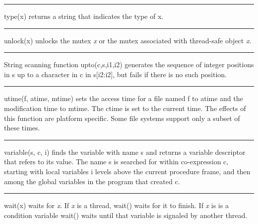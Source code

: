 \bigskip\hrule\vspace{0.1cm}

\noindent
{}\textsf{type(x)} returns a string that indicates the type
of \textsf{x}.

\bigskip\hrule\vspace{0.1cm}

\noindent
{}\textsf{unlock(x)} unlocks the mutex {\textit x} or the mutex
associated with thread-safe object {\textit x}.

\bigskip\hrule\vspace{0.1cm}

\noindent
String scanning function \textsf{upto(c,s,i1,i2)}
generates the sequence of integer positions in \textsf{s} up to a
character in \textsf{c} in \textsf{s[i2:i2]}, but fails if there is no
such position.

\bigskip\hrule\vspace{0.1cm}

\noindent
\textsf{utime(f, atime, mtime)} sets the access
time for a file named \textsf{f} to \textsf{atime} and the modification
time to \textsf{mtime}. The \textsf{ctime} is set to the current time.
The effects of this function are platform specific. Some file systems
support only a subset of these times.

\bigskip\hrule\vspace{0.1cm}

\noindent
{}\textsf{variable(s, c, i)} finds the variable
with name \textsf{s} and returns a variable descriptor that refers to
its value. The name \textsf{s} is searched for within co-expression
\textsf{c}, starting with local variables \textsf{i} levels above the
current procedure frame, and then among the global variables in the
program that created \textsf{c}.

\bigskip\hrule\vspace{0.1cm}

\noindent
{}\textsf{wait(x)} waits for {\textit x}. If {\textit x} is
a thread, {\textsf wait()} waits for it to finish. If {\textit x} is
is a condition variable {\textsf wait()} waits until that variable is
signaled by another thread.

